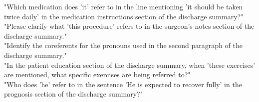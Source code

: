 "Which medication does 'it' refer to in the line mentioning 'it should be taken twice daily' in the medication instructions section of the discharge summary?"\\
"Please clarify what 'this procedure' refers to in the surgeon's notes section of the discharge summary."\\
"Identify the coreferents for the pronouns used in the second paragraph of the discharge summary."\\
"In the patient education section of the discharge summary, when 'these exercises' are mentioned, what specific exercises are being referred to?"\\
"Who does 'he' refer to in the sentence 'He is expected to recover fully' in the prognosis section of the discharge summary?"